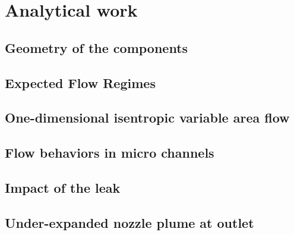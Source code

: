 \section{Analytical work}


\subsection{Geometry of the components}\label{sec:geometry}


\subsection{Expected Flow Regimes}\label{sec:expected-flow-regimes}

\newpage

\subsection{One-dimensional isentropic variable area flow}\label{sec:one-dim-isentropic}

\newpage

\subsection{Flow behaviors in micro channels}\label{sec:micro-channels}

\newpage

\subsection{Impact of the leak}\label{sec:disconnected-reservoirs}

\newpage

\subsection{Under-expanded nozzle plume at outlet}\label{sec:outlet_plume}

\newpage
